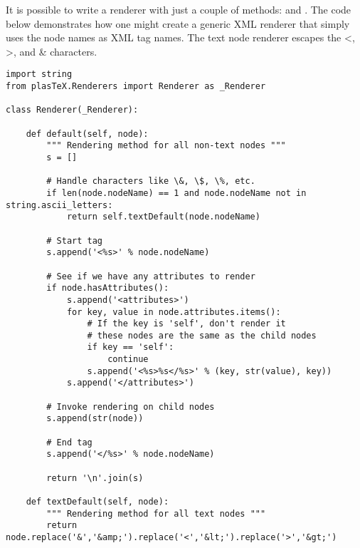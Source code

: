 It is possible to write a renderer with just a couple of methods:
 and .
The code below demonstrates how one might create a generic XML
renderer that simply uses the node names as XML tag names.
The text node renderer escapes the <, >, and \& characters.
\begin{verbatim}
import string
from plasTeX.Renderers import Renderer as _Renderer

class Renderer(_Renderer):

    def default(self, node):
        """ Rendering method for all non-text nodes """
        s = []

        # Handle characters like \&, \$, \%, etc.
        if len(node.nodeName) == 1 and node.nodeName not in string.ascii_letters:
            return self.textDefault(node.nodeName)

        # Start tag
        s.append('<%s>' % node.nodeName)

        # See if we have any attributes to render
        if node.hasAttributes():
            s.append('<attributes>')
            for key, value in node.attributes.items():
                # If the key is 'self', don't render it
                # these nodes are the same as the child nodes
                if key == 'self':
                    continue
                s.append('<%s>%s</%s>' % (key, str(value), key))
            s.append('</attributes>')

        # Invoke rendering on child nodes
        s.append(str(node))

        # End tag
        s.append('</%s>' % node.nodeName)

        return '\n'.join(s)

    def textDefault(self, node):
        """ Rendering method for all text nodes """
        return node.replace('&','&amp;').replace('<','&lt;').replace('>','&gt;')
\end{verbatim}

